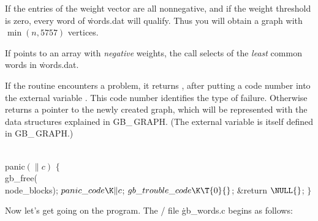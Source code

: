 If the entries of the weight vector are all nonnegative, and if the
weight threshold is zero, every word of \.{words.dat} will qualify. Thus
you will obtain a graph with $\min(n,5757)$ vertices.

If  points to an array with {\sl negative\/} weights, the call
 selects  of the {\sl
least\/} common
words in \.{words.dat}.

\fi

If the  routine encounters a problem, it returns \PB{$%
\NULL$}, after putting
a code number into the external variable . This code number
identifies the type of failure. Otherwise  returns a pointer to
the
newly created graph, which will be represented with the data structures
explained in {\sc GB\_\,GRAPH}. (The external variable  is
itself
defined in {\sc GB\_\,GRAPH}.)

\Y\B\4\D\\{panic}$(\|c)$\5
${}\{{}$\5
\1\\{gb\_free}(\\{node\_blocks});\6
${}\\{panic\_code}\K\|c{}$;\5
${}\\{gb\_trouble\_code}\K\T{0}{}$;\5
\&{return} ${}\NULL{}$;\5
${}\}{}$\2\par
\fi

Now let's get going on the program. The \CEE/ file \.{gb\_words.c} begins
as follows:

